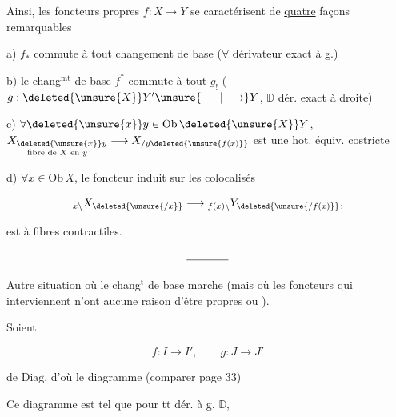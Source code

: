 
Ainsi, les foncteurs propres $f:X\longrightarrow Y$ se caractérisent de \uline{quatre} façons remarquables

a) $f_*$ commute à tout changement de base ($\forall$ dérivateur  exact à g.)

b) le chang$^{\mathrm{mt}}$ de base $f^*$ commute à tout $g_!$ ($g:\deleted{\unsure{X}}Y'\unsure{\relbar\joinrel\relbar|\longrightarrow}Y$, $\mathbb D$ dér. exact à droite)

c) $\forall\deleted{\unsure{x}}y\in\mathrm{Ob}\,\deleted{\unsure{X}}Y$, $\underset{\text{fibre de }X\text{ en }y}{X_{\deleted{\unsure{x}}y}}\longrightarrow X_{/y\deleted{\unsure{f(x)}}}$ est une hot. équiv. costricte 

d) $\forall x\in\mathrm{Ob}\,X$,  le foncteur induit sur les colocalisés

\[
{}_{x\backslash}X_{\deleted{\unsure{/x}}}\longrightarrow{}_{f(x)\backslash}Y_{\deleted{\unsure{/f(x)}}},
\]

est à fibres contractiles.

\[ \rule{1.3cm}{0.4pt} \]

Autre situation  où le chang$^{\mathrm t}$ de base marche (mais où les foncteurs qui interviennent n'ont aucune raison d'être propres ou ).

Soient

\[ f:I\longrightarrow I',\qquad g:J\longrightarrow J' \]

de $\mathrm{Diag}$, d'où le diagramme (comparer page 33)


Ce diagramme  est tel que pour tt dér. à g. $\mathbb D$,
